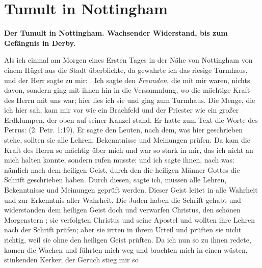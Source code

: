 \chapter[Tumult in Nottingham]{Tumult in Nottingham}

\begin{center}
\textbf{Der Tumult in Nottingham. Wachsender Widerstand, bis zum
Gefängnis in Derby.}
\end{center}


Als  ich einmal am Morgen eines Ersten Tages in der Nähe
von Nottingham von einem Hügel aus die 
Stadt überblickte, da
gewahrte ich das riesige Turmhaus, und der Herr sagte zu mir:
. Ich sagte den \textit{Freunden},
die mit mir waren, nichts davon, sondern ging mit ihnen hin in
die Versammlung, wo die mächtige Kraft des Herrn mit uns
war; hier lies ich sie und ging zum Turmhaus. Die Menge,
die ich hier sah, kam mir vor wie ein Brachfeld und der Priester
wie ein großer Erdklumpen, der oben auf seiner Kanzel stand.
Er hatte zum Text die Worte des Petrus: 
(2. Petr. 1:19). 
Er sagte den Leuten, nach dem, was hier geschrieben 
stehe, sollten sie alle Lehren, Bekenntnisse und Meinungen
prüfen. Da kam die Kraft des Herrn so mächtig über mich und
war so stark in mir, das ich nicht an mich halten konnte, sondern
rufen musste: 
und ich sagte ihnen, nach was: nämlich nach dem heiligen Geist,
durch den die heiligen Männer Gottes die Schrift geschrieben
haben. Durch diesen, sagte ich, müssen alle Lehren, Bekenntnisse
und Meinungen geprüft werden. Dieser Geist leitet in alle
Wahrheit und zur Erkenntnis aller Wahrheit. Die 
Juden haben
die Schrift gehabt und widerstanden dem heiligen Geist doch und 
verwarfen Christus, den schönen Morgenstern ; sie verfolgten Christus
und seine Apostel und wollten ihre Lehren nach der Schrift prüfen;
aber sie irrten in ihrem Urteil und prüften sie nicht richtig, weil
sie ohne den heiligen Geist prüften. Da ich nun so zu ihnen
redete, kamen die Wachen und führten mich weg und brachten
mich in einen wüsten, stinkenden Kerker; der Geruch stieg mir so
